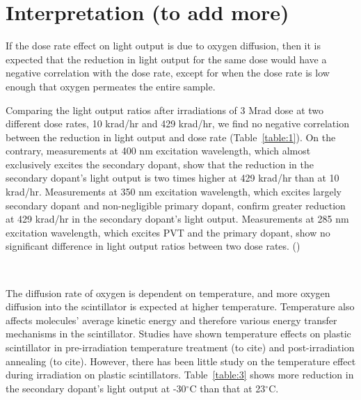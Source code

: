 \documentclass[preprint,12pt]{elsarticle}
\begin{document}
\section{Interpretation (to add more)}
If the dose rate effect on light output is due to oxygen diffusion, then it is expected that the reduction in light output 
for the same dose would have a negative correlation with the dose rate, except for when the dose rate is low enough that 
oxygen permeates the entire sample. 

Comparing the light output ratios after irradiations of 3 Mrad dose at two different dose rates, 10 krad/hr and 429 krad/hr, 
we find no negative correlation between the reduction in light output and dose rate (Table~\ref{table:1}).
On the contrary, measurements at 400 nm excitation wavelength, which almost exclusively excites the secondary dopant, 
show that the reduction in the secondary dopant's light output is two times higher at 429 krad/hr than at 10 krad/hr.
Measurements at 350 nm excitation wavelength, which excites largely secondary dopant and non-negligible primary dopant, 
confirm greater reduction at 429 krad/hr in the secondary dopant's light output. 
Measurements at 285 nm excitation wavelength, which excites PVT and the primary dopant, show no significant difference 
in light output ratios between two dose rates. 
({}) 

~                                     

The diffusion rate of oxygen is dependent on temperature, and more oxygen diffusion into the scintillator is expected at higher temperature. 
Temperature also affects molecules' average kinetic energy and therefore various energy transfer mechanisms in the scintillator. 
Studies have shown temperature effects on plastic scintillator in pre-irradiation temperature treatment (to cite) and post-irradiation 
annealing (to cite). 
However, there has been little study on the temperature effect during irradiation on plastic scintillators.
Table~\ref{table:3} shows more reduction in the secondary dopant's light output at -30$^\circ$C than that at 23$^\circ$C. 





\end{document}
